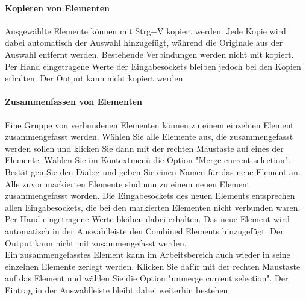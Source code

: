 \paragraph{Kopieren von Elementen}
Ausgew\"ahlte Elemente k\"onnen mit Strg+V kopiert werden. Jede Kopie wird dabei automatisch der Auswahl hinzugef\"ugt, w\"ahrend die Originale aus der Auswahl entfernt werden. Bestehende Verbindungen werden nicht mit kopiert. Per Hand eingetragene Werte der Eingabesockets bleiben jedoch bei den Kopien erhalten. Der Output kann nicht kopiert werden.

\paragraph{Zusammenfassen von Elementen}
Eine Gruppe von verbundenen Elementen k\"onnen zu einem einzelnen Element zusammengefasst werden. W\"ahlen Sie alle Elemente aus, die zusammengefasst werden sollen und klicken Sie dann mit der rechten Maustaste auf eines der Elemente. W\"ahlen Sie im Kontextmen\"u die Option "Merge current selection". Best\"atigen Sie den Dialog und geben Sie einen Namen f\"ur das neue Element an. Alle zuvor markierten Elemente sind nun zu einem neuen Element zusammengefasst worden. Die Eingabesockets des neuen Elements entsprechen allen Eingabesockets, die bei den markierten Elementen nicht verbunden waren. Per Hand eingetragene Werte bleiben dabei erhalten. Das neue Element wird automatisch in der Auswahlleiste den Combined Elements hinzugef\"ugt. Der Output kann nicht mit zusammengefasst werden.
\\
Ein zusammengefasstes Element kann im Arbeitsbereich auch wieder in seine einzelnen Elemente zerlegt werden. Klicken Sie daf\"ur mit der rechten Maustaste auf das Element und w\"ahlen Sie die Option "unmerge current selection". Der Eintrag in der Auswahlleiste bleibt dabei weiterhin bestehen.

